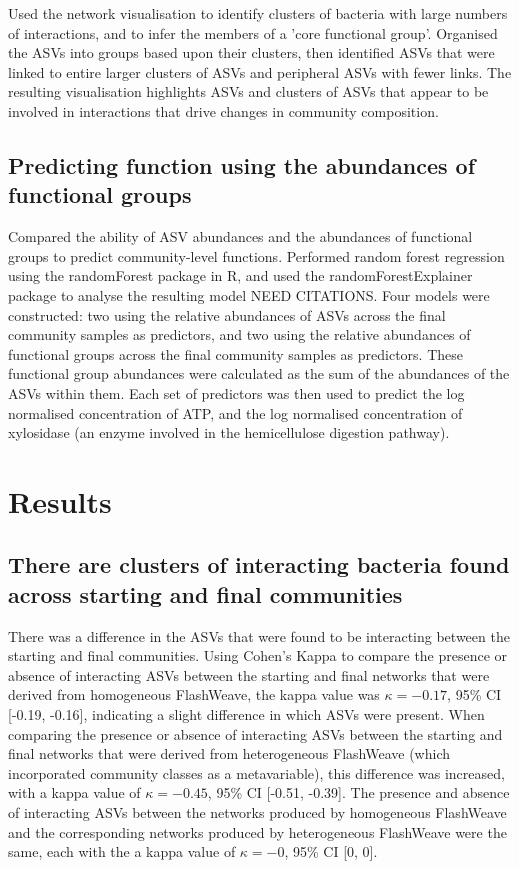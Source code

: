 \documentclass[11pt]{article}
\begin{document}
Used the network visualisation to identify clusters of bacteria with large numbers of interactions, and to infer the members of a 'core functional group'. Organised the ASVs into groups based upon their clusters, then identified ASVs that were linked to entire larger clusters of ASVs and peripheral ASVs with fewer links. The resulting visualisation highlights ASVs and clusters of ASVs that appear to be involved in interactions that drive changes in community composition.

\subsection{Predicting function using the abundances of functional groups}
Compared the ability of ASV abundances and the abundances of functional groups to predict community-level functions. Performed random forest regression using the randomForest package in R, and used the randomForestExplainer package to analyse the resulting model NEED CITATIONS. Four models were constructed: two using the relative abundances of ASVs across the final community samples as predictors, and two using the relative abundances of functional groups across the final community samples as predictors. These functional group abundances were calculated as the sum of the abundances of the ASVs within them. Each set of predictors was then used to predict the log normalised concentration of ATP, and the log normalised concentration of xylosidase (an enzyme involved in the hemicellulose digestion pathway).

\section{Results}
\subsection{There are clusters of interacting bacteria found across starting and final communities}

There was a difference in the ASVs that were found to be interacting between the starting and final communities.
Using Cohen's Kappa to compare the presence or absence of interacting ASVs between the starting and final networks that were derived from homogeneous FlashWeave, the kappa value was \(\kappa = -0.17\), 95\% CI [-0.19, -0.16], indicating a slight difference in which ASVs were present. When comparing the presence or absence of interacting ASVs between the starting and final networks that were derived from heterogeneous FlashWeave (which incorporated community classes as a metavariable), this difference was increased, with a kappa value of \(\kappa = -0.45\), 95\% CI [-0.51, -0.39]. The presence and absence of interacting ASVs between the networks produced by homogeneous FlashWeave and the corresponding networks produced by heterogeneous FlashWeave were the same, each with the a kappa value of \(\kappa = -0\), 95\% CI [0, 0].
\end{document}

